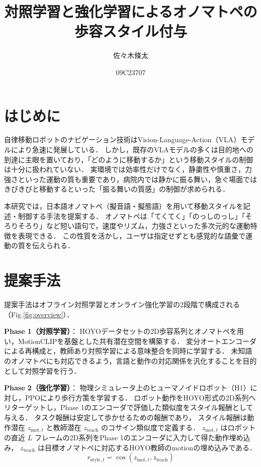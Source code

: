 \documentclass[10pt,twocolumn]{jarticle}
\title{対照学習と強化学習によるオノマトペの歩容スタイル付与}
\date{09C23707} %
\author{佐々木條太}
\begin{document}
\maketitle
\section{はじめに}
自律移動ロボットのナビゲーション技術はVision-Language-Action（VLA）モデルにより急速に発展している．
しかし，既存のVLAモデルの多くは目的地への到達に主眼を置いており，「どのように移動するか」という移動スタイルの制御は十分に扱われていない．
実環境では効率性だけでなく，静粛性や慎重さ，力強さといった運動の質も重要であり，病院内では静かに振る舞い，急ぐ場面ではきびきびと移動するといった「振る舞いの質感」の制御が求められる．

本研究では，日本語オノマトペ（擬音語・擬態語）を用いて移動スタイルを記述・制御する手法を提案する．
オノマトペは「てくてく」「のっしのっし」「そろりそろり」など短い語句で，速度やリズム，力強さといった多次元的な運動特徴を表現できる．
この性質を活かし，ユーザは指定せずとも感覚的な語彙で運動の質を伝えられる．

\section{提案手法}
提案手法はオフライン対照学習とオンライン強化学習の2段階で構成される（Fig.\ref{fig:overview}）．

\textbf{Phase 1（対照学習）}：
HOYOデータセット\cite{hoyo}の2D歩容系列とオノマトペを用い，MotionCLIP\cite{MotionCLIP}を基盤とした共有潜在空間を構築する．
変分オートエンコーダによる再構成と，教師あり対照学習による意味整合を同時に学習する．
未知語のオノマトペにも対応できるよう，言語と動作の対応関係を汎化することを目的として対照学習を行う．

\textbf{Phase 2（強化学習）}：
物理シミュレータ上のヒューマノイドロボット（H1）に対し，PPOにより歩行方策を学習する．
ロボット動作をHOYO形式の2D系列へリターゲットし，Phase 1のエンコーダで評価した類似度をスタイル報酬として与える．
タスク報酬は安定して歩かせるための報酬であり，
スタイル報酬は動作潜在 $z_{\mathrm{mot},t}$ と教師潜在 $z_{\mathrm{teach}}$ のコサイン類似度で定義する．
$z_{\mathrm{mot},t}$ はロボットの直近 $L$ フレームの2D系列をPhase 1のエンコーダに入力して得た動作埋め込み，
$z_{\mathrm{teach}}$ は目標オノマトペに対応するHOYO教師のmotionの埋め込みである．
\begingroup
  \setlength{\abovedisplayskip}{2pt}
  \setlength{\belowdisplayskip}{2pt}
  \setlength{\abovedisplayshortskip}{2pt}
  \setlength{\belowdisplayshortskip}{2pt}
  \begin{equation}
      r_{\mathrm{style},t} = \cos\!\left(z_{\mathrm{mot},t}, z_{\mathrm{teach}}\right)
  \end{equation}
\endgroup
\end{document}
